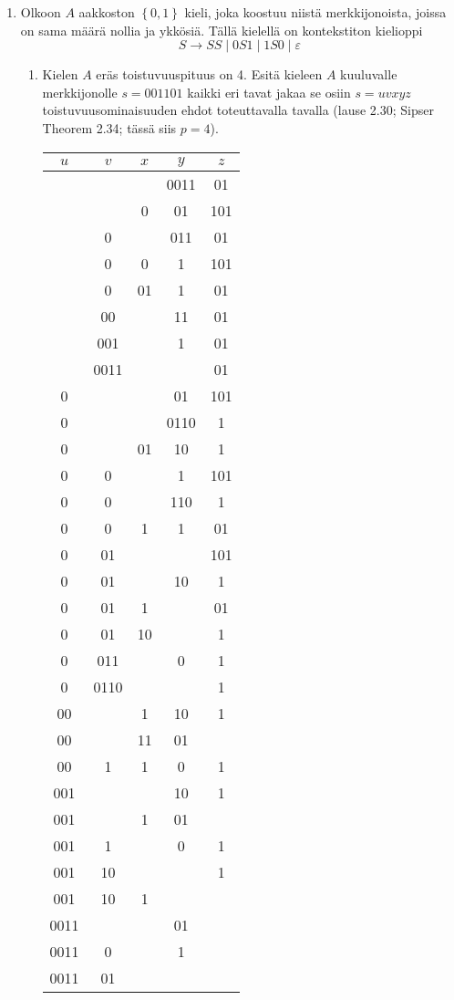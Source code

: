 \documentclass[a4paper,11pt, draft]{article}
\newcommand{\set}[1]{{\left\{ #1 \right\}}}
\newcommand{\ve}{\varepsilon}
\begin{document}
\begin{enumerate}
  \item
    Olkoon $A$ aakkoston $\set{0,1}$ kieli, joka koostuu niistä
    merkkijonoista, joissa on sama määrä nollia ja ykkösiä. Tällä kielellä on
    kontekstiton kielioppi
%
    \begin{equation*}
      S \to SS \mid 0S1 \mid 1S0 \mid \ve
    \end{equation*}
%
    \begin{enumerate}
    \item
      Kielen $A$ eräs toistuvuuspituus on 4. Esitä kieleen $A$ kuuluvalle
      merkkijonolle $s=001101$ kaikki eri tavat jakaa se osiin $s=uvxyz$
      toistuvuusominaisuuden ehdot toteuttavalla tavalla (lause 2.30; Sipser
      Theorem 2.34; tässä siis $p=4$).

      \begin{tabular}{ccccc}
          \toprule
          $u$         & $v$  & $x$ & $y$  & $z$ \tabularnewline
          \midrule
                      &      &     & 0011 & 01\tabularnewline
                      &      & 0   & 01   & 101\tabularnewline
                      & 0    &     & 011  & 01\tabularnewline
                      & 0    & 0   & 1    & 101\tabularnewline
                      & 0    & 01  & 1    & 01\tabularnewline
                      & 00   &     & 11   & 01\tabularnewline
                      & 001  &     & 1    & 01\tabularnewline
                      & 0011 &     &      & 01\tabularnewline
          0           &      &     & 01   & 101\tabularnewline
          0           &      &     & 0110 & 1\tabularnewline
          0           &      & 01  & 10   & 1\tabularnewline
          0           & 0    &     & 1    & 101\tabularnewline
          0           & 0    &     & 110  & 1\tabularnewline
          0           & 0    & 1   & 1    & 01\tabularnewline
          0           & 01   &     &      & 101\tabularnewline
          0           & 01   &     & 10   & 1\tabularnewline
          0           & 01   & 1   &      & 01\tabularnewline
          0           & 01   & 10  &      & 1\tabularnewline
          0           & 011  &     & 0    & 1\tabularnewline
          0           & 0110 &     &      & 1\tabularnewline
          00          &      & 1   & 10   & 1\tabularnewline
          00          &      & 11  & 01   & \tabularnewline
          00          & 1    & 1   & 0    & 1\tabularnewline
          001         &      &     & 10   & 1\tabularnewline
          001         &      & 1   & 01   & \tabularnewline
          001         & 1    &     & 0    & 1\tabularnewline
          001         & 10   &     &      & 1\tabularnewline
          001         & 10   & 1   &      & \tabularnewline
          0011        &      &     & 01   & \tabularnewline
          0011        & 0    &     & 1    & \tabularnewline
          0011        & 01   &     &      & \tabularnewline
          \bottomrule
      \end{tabular}


\end{enumerate}
\end{enumerate}
\end{document}
